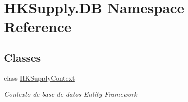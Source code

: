 \hypertarget{namespace_h_k_supply_1_1_d_b}{}\section{H\+K\+Supply.\+DB Namespace Reference}
\label{namespace_h_k_supply_1_1_d_b}
\subsection*{Classes}
\begin{DoxyCompactItemize}
\item 
class \mbox{\hyperlink{class_h_k_supply_1_1_d_b_1_1_h_k_supply_context}{H\+K\+Supply\+Context}}
\begin{DoxyCompactList}\small\item\em Contexto de base de datos Entity Framework \end{DoxyCompactList}\end{DoxyCompactItemize}
